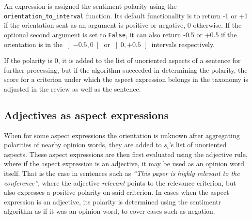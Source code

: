 An expression is assigned the sentiment polarity using the \texttt{orientation\_to\_interval} function. Its default functionality is to return -1 or +1 if the orientation sent as an argument is positive or negative, 0 otherwise. If the optional second argument is set to \texttt{False}, it can also return -0.5 or +0.5  if the orientation is in the $\left]-0.5, 0\right[$ or $\left]0, +0.5\right[$ 
intervals respectively.

If the polarity is 0, it is added to the list of unoriented aspects of a sentence for further processing, but if the algorithm succeeded in determining the polarity, the score for a criterion under which the aspect expression belongs in the taxonomy is adjusted in the review as well as the sentence.
\subsection{Adjectives as aspect expressions}
When for some aspect expressions the orientation is unknown after aggregating polarities of nearby opinion words, they are added to $s_{i}$'s list of unoriented aspects. These aspect expressions are then first evaluated using the adjective rule, where if the aspect expression is an adjective, it may be used as an opinion word itself. That is the case in sentences such as \textit{``This paper is highly relevant to the conference''}, where the adjective \textit{relevant} points to the relevance criterion, but also expresses a positive polarity on said criterion. 
In cases when the aspect expression is an adjective, its polarity is determined using the sentimentr algorithm as if it was an opinion word, to cover cases such as negation.

